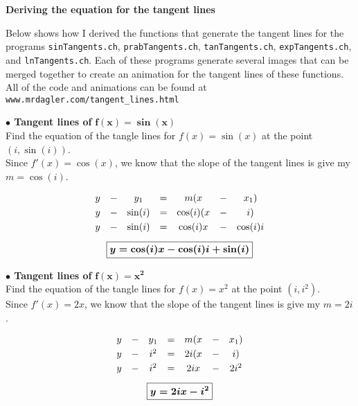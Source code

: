 \documentclass[letterpaper]{article}
\begin{document}
\Large

\begin{center}
	\textbf{Deriving the equation for the tangent lines}
\end{center}

\large

Below shows how I derived the functions that generate the tangent lines for the programs {\tt sinTangents.ch}, {\tt prabTangents.ch}, {\tt tanTangents.ch}, {\tt expTangents.ch}, and {\tt lnTangents.ch}. Each of these programs generate several images that can be merged together to create an animation for the tangent lines of these functions. All of the code and animations can be found at {\tt www.mrdagler.com/tangent\_lines.html}

\bigskip
\bigskip


\textbf{$\bullet$ Tangent lines of} $\boldsymbol{f(x)=\sin(x)}$ \\

Find the equation of the tangle lines for $f(x)=\sin(x)$ at the point $(i,\sin(i))$. \\[.1cm]

Since $f'(x)=\cos(x)$, we know that the slope of the tangent lines is give my $m=\cos(i)$. 

\[ \begin{array}{*{7}c}
	y & - & y_1 & = & m(x & - & x_1 )  \\[0.1cm]
	y & - & \sin(i) & = & \cos(i)(x & - & i )  \\[0.1cm]
	y & - & \sin(i) & = & \cos(i)x & - & \cos(i)i \\[0.3cm] 
	\multicolumn{7}{c}{
		\boxed{\boldsymbol{y=\cos(i)x-\cos(i)i+\sin(i)}}
	} \\ 
\end{array} \]

\bigskip
\bigskip

\textbf{$\bullet$ Tangent lines of} $\boldsymbol{f(x)=x^2}$ \\

Find the equation of the tangle lines for $f(x)=x^2$ at the point $(i,i^2)$. \\[.1cm]

Since $f'(x)=2x$, we know that the slope of the tangent lines is give my $m=2i$. 

\[ \begin{array}{*{7}c}
	y & - & y_1 & = & m(x & - & x_1 )  \\[0.1cm]
	y & - & i^2 & = & 2i(x & - & i )  \\[0.1cm]
	y & - & i^2 & = & 2ix & - & 2i^2  \\[0.3cm] 
	\multicolumn{7}{c}{
		\boxed{\boldsymbol{y=2ix-i^2}}
	}	
\end{array} \]
\end{document}
